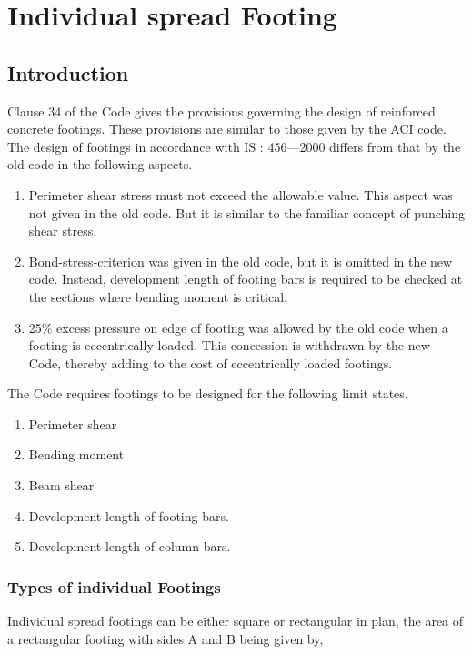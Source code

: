 \documentclass{book}
\begin{document}
\chapter{Individual spread Footing}
\section{Introduction}
Clause 34 of the Code gives the provisions governing the design of reinforced concrete footings. These provisions are similar to those given by the ACI code. The design of footings in accordance with IS : 456—2000 differs from that by the old code in the following aspects.

\begin{enumerate}
\item Perimeter shear stress must not exceed the allowable value. This aspect was not
given in the old code. But it is similar to the familiar concept of punching shear
stress.

\item Bond-stress-criterion was given in the old code, but it is omitted in the new code.
Instead, development length of footing bars is required to be checked at the sections
where bending moment is critical.

\item 25\% excess pressure on edge of footing was allowed by the old code when a footing
 is eccentrically loaded. This concession is withdrawn by the new Code, thereby
adding to the cost of eccentrically loaded footings.

\end{enumerate}
The Code requires footings to be designed for the following limit states.

\begin{enumerate}
\item Perimeter shear
\item Bending moment
\item Beam shear
\item  Development length of footing bars.
\item Development length of column bars.
\end{enumerate}

\subsection{Types of individual Footings}
Individual spread footings can be either square or rectangular in plan, the area of a rectangular footing with sides A and B being given by,
\end{document}
